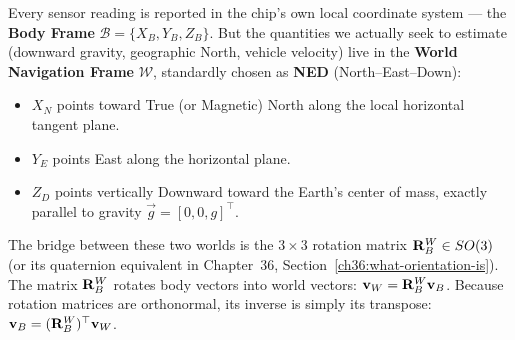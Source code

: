Every sensor reading is reported in the chip's own local coordinate system --- the
\textbf{Body Frame} $\mathcal{B} = \{X_B, Y_B, Z_B\}$. But the quantities we actually
seek to estimate (downward gravity, geographic North, vehicle velocity) live in the
\textbf{World Navigation Frame} $\mathcal{W}$, standardly chosen as \textbf{NED}
(North--East--Down):
\begin{itemize}
  \item $X_N$ points toward True (or Magnetic) North along the local horizontal tangent plane.
  \item $Y_E$ points East along the horizontal plane.
  \item $Z_D$ points vertically Downward toward the Earth's center of mass, exactly parallel to gravity $\vec{g} = [0, 0, g]^\top$.
\end{itemize}

The bridge between these two worlds is the $3\times 3$ rotation matrix $\mathbf{R}_B^W \in SO(3)$
(or its quaternion equivalent in Chapter~36, Section~\ref{ch36:what-orientation-is}). The matrix $\mathbf{R}_B^W$
rotates body vectors into world vectors: $\mathbf{v}_W = \mathbf{R}_B^W \mathbf{v}_B$. Because rotation
matrices are orthonormal, its inverse is simply its transpose: $\mathbf{v}_B = (\mathbf{R}_B^W)^\top \mathbf{v}_W$.

